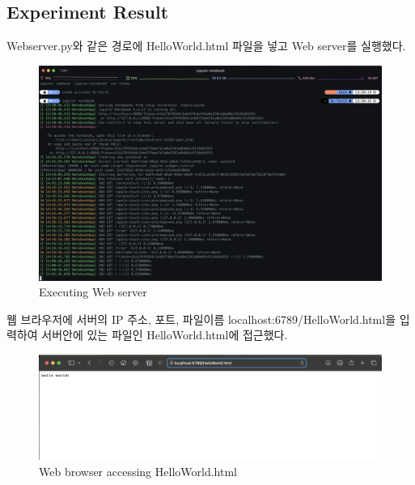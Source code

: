 \subsection{Experiment Result}
Webserver.py와 같은 경로에 HelloWorld.html 파일을 넣고 Web server를 실행했다. \\
\vspace{-4mm}
\begin{figure}[!h]\centering 
	\includegraphics[width=.99\textwidth]{image/week09/1-1.png}
	\caption{\footnotesize
	Executing Web server}
	\vspace{-10pt}
\end{figure}
\clearpage

웹 브라우저에 서버의 IP 주소, 포트, 파일이름 localhost:6789/HelloWorld.html을 입력하여 서버안에 있는 파일인 HelloWorld.html에 접근했다. \\
\vspace{-4mm}
\begin{figure}[!h]\centering 
	\includegraphics[width=.99\textwidth]{image/week09/1-2.png}
	\caption{\footnotesize
	Web browser accessing HelloWorld.html}
	\vspace{-10pt}
\end{figure}

\clearpage

